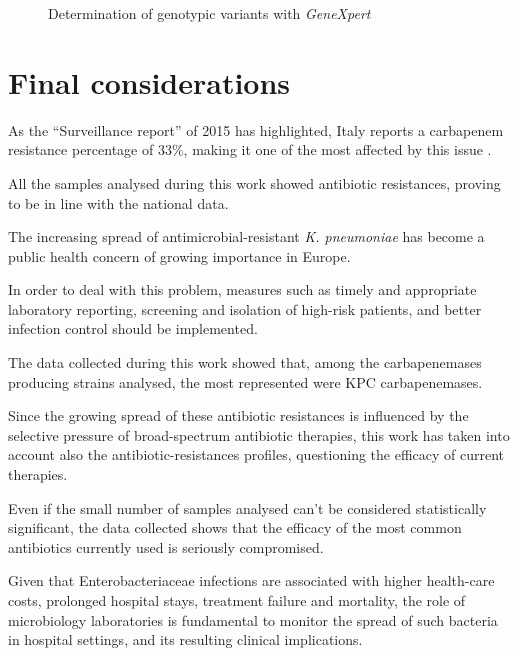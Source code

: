 \documentclass[11pt]{report}
\begin{document}
\begin{figure}[h!]
\centering

\caption{Determination of genotypic variants with \emph{GeneXpert}}
\label{genexpert}
\end{figure}

\chapter{Final considerations}

As the ``Surveillance report'' of 2015 has highlighted, Italy reports a carbapenem resistance percentage of 33$\%$, making it one of the most affected by this issue \cite{ECDC_Surveillance}.

All the samples analysed during this work showed antibiotic resistances, proving to be in line with the national data.

The increasing spread of antimicrobial-resistant \emph{K. pneumoniae} has become a public health concern of growing importance in Europe.

In order to deal with this problem, measures such as timely and appropriate laboratory reporting, screening and isolation of high-risk patients, and better infection control should be implemented.

The data collected during this work showed that, among the carbapenemases producing strains analysed, the most represented were KPC carbapenemases.

Since the growing spread of these antibiotic resistances is influenced by the selective pressure of broad-spectrum antibiotic therapies, this work has taken into account also the antibiotic-resistances profiles, questioning the efficacy of current therapies.
 
Even if the small number of samples analysed can't be considered statistically significant, the data collected shows that the efficacy of the most common antibiotics currently used is seriously compromised.

Given that Enterobacteriaceae infections are associated with higher health-care costs, prolonged hospital stays, treatment failure and mortality, the role of microbiology laboratories is fundamental to monitor the spread of such bacteria in hospital settings, and its resulting clinical implications.







\end{document}
